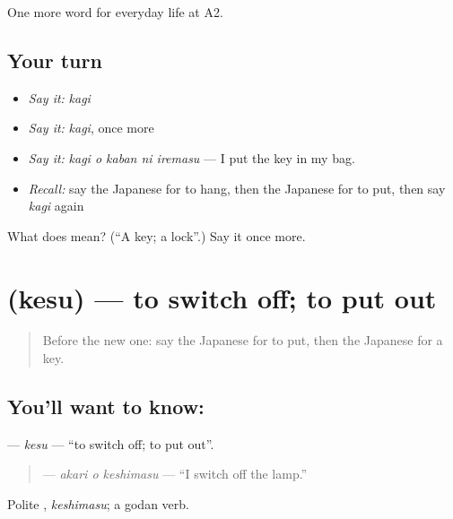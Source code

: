 \begin{grammarlens}[title={What you've built}]
One more word for everyday life at A2.
\end{grammarlens}

\subsection*{Your turn}
\begin{itemize}
\raggedright
  \item \emph{Say it:} \emph{kagi}
  \item \emph{Say it:} \emph{kagi}, once more
  \item \emph{Say it:} \emph{kagi o kaban ni iremasu} — I put the key in my bag.
  \item \emph{Recall:} say the Japanese for to hang, then the Japanese for to put, then say \emph{kagi} again
\end{itemize}

\begin{tcolorbox}[breakable,colback=teal!4,colframe=teal!35!black,title={Before you move on}]
What does  mean? (\textquotedblleft{}A key; a lock\textquotedblright{}.) Say it once more.
\end{tcolorbox}
\section[\texorpdfstring{\ja{けす} (kesu)}{けす (kesu)}]{ (kesu) — to switch off; to put out}

\label{lesson:JA-C158-kesu}



\begin{quote}
Before the new one: say the Japanese for to put, then the Japanese for a key.
\end{quote}

\subsection*{You'll want to know: }
\textbf{} — \emph{kesu} — \textquotedblleft{}to switch off; to put out\textquotedblright{}.

\begin{quote}
\textbf{ } — \emph{akari o keshimasu} — \textquotedblleft{}I switch off the lamp.\textquotedblright{}
\end{quote}

Polite \textbf{}, \emph{keshimasu}; a godan verb.


